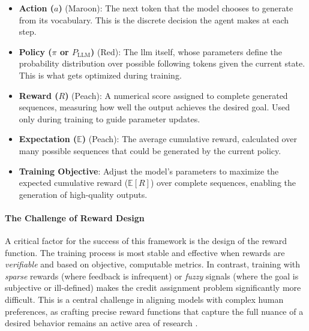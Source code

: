 \begin{tcolorbox}
\begin{itemize}
\item \textbf{Action ($a$)} ({\color{ActionColor}Maroon}): The next token that the model chooses to generate from its vocabulary. This is the discrete decision the agent makes at each step.

\item \textbf{Policy ($\pi$ or $P_{\text{LLM}}$)} ({\color{PolicyColor}Red}): The \gls{llm} itself, whose parameters define the probability distribution over possible following tokens given the current state. This is what gets optimized during training.

\item \textbf{Reward ($R$)} ({\color{RewardColor}Peach}): A numerical score assigned to complete generated sequences, measuring how well the output achieves the desired goal. Used only during training to guide parameter updates.

\item \textbf{Expectation ($\mathbb{E}$)} ({\color{RewardColor}Peach}): The average cumulative reward, calculated over many possible sequences that could be generated by the current policy. 

\item \textbf{Training Objective}: Adjust the model's parameters to maximize the expected cumulative reward ($\mathbb{E}[R]$) over complete sequences, enabling the generation of high-quality outputs.
\end{itemize}

\end{tcolorbox}

\paragraph{The Challenge of Reward Design}
A critical factor for the success of this framework is the design of the reward function. The training process is most stable and effective when rewards are \textit{verifiable} and based on objective, computable metrics. 
In contrast, training with \textit{sparse} rewards (where feedback is infrequent) or \textit{fuzzy} signals (where the goal is subjective or ill-defined) makes the credit assignment problem significantly more difficult. 
This is a central challenge in aligning models with complex human preferences, as crafting precise reward functions that capture the full nuance of a desired behavior remains an active area of research \autocite{ouyang2022training}.


